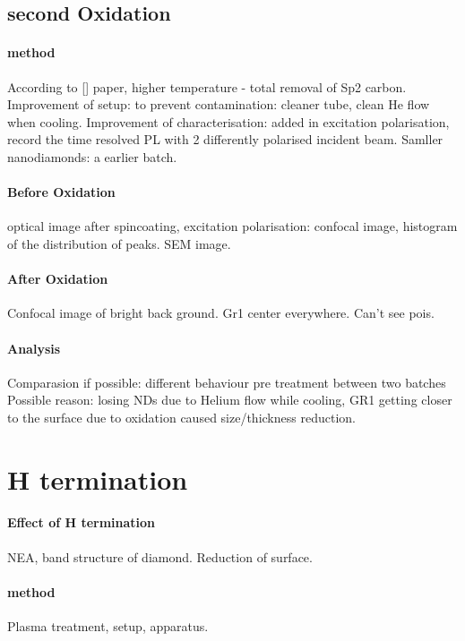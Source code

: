 \subsection[Second Oxidation]{second Oxidation}

\paragraph{method} According to [] paper, higher temperature - total removal of Sp2 carbon. Improvement of setup: to prevent contamination: cleaner tube, clean He flow when cooling. Improvement of characterisation: added in excitation polarisation, record the time resolved PL with 2 differently polarised incident beam. Samller nanodiamonds: a earlier batch.

\paragraph{Before Oxidation} optical image after spincoating, excitation polarisation: confocal image, histogram of the distribution of peaks. SEM image.
\paragraph{After Oxidation} Confocal image of bright back ground. Gr1 center everywhere. Can't see pois.
\paragraph{Analysis} 
Comparasion if possible: different behaviour pre treatment between two batches
Possible reason: losing NDs due to Helium flow while cooling, GR1 getting closer to the surface due to oxidation caused size/thickness reduction.


\section[H termination]{H termination}
\paragraph{Effect of H termination}
NEA, band structure of diamond. Reduction of surface.
\paragraph{method} Plasma treatment, setup, apparatus.
